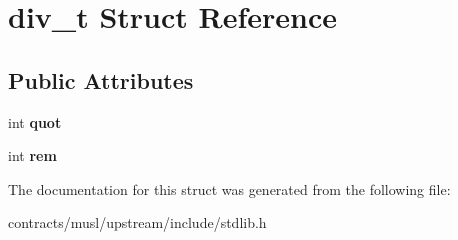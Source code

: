 \hypertarget{structdiv__t}{}\section{div\+\_\+t Struct Reference}
\label{structdiv__t}
\subsection*{Public Attributes}
\begin{DoxyCompactItemize}
\item 
\mbox{\label{structdiv__t_a0b9dda2884048daa68ca4aaa12b17b9a}} 
int {\bfseries quot}
\item 
\mbox{\label{structdiv__t_ac64389de252de53eda8b4f8dbb7c623f}} 
int {\bfseries rem}
\end{DoxyCompactItemize}


The documentation for this struct was generated from the following file\+:\begin{DoxyCompactItemize}
\item 
contracts/musl/upstream/include/stdlib.\+h\end{DoxyCompactItemize}

